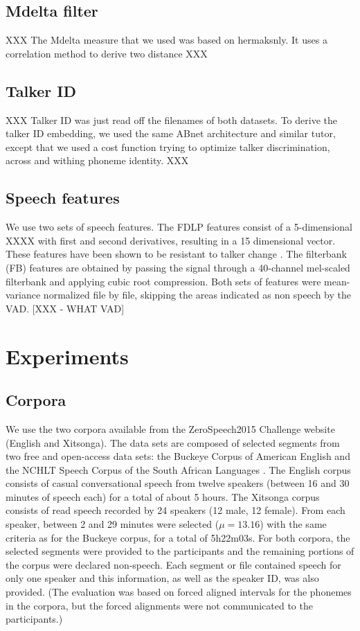 \documentclass[a4paper]{article}
\begin{document}
\subsection{Mdelta filter}

XXX
The Mdelta measure that we used was based on hermaksnly. It uses a correlation method to derive two distance
XXX

\subsection{Talker ID}

XXX
Talker ID was just read off the filenames of both datasets. To derive the talker ID embedding, we used the same ABnet architecture and similar tutor, except that we used a cost function trying to optimize talker discrimination, across and withing phoneme identity.
XXX

\subsection{Speech features}

We use two sets of speech features. The FDLP features consist of a 5-dimensional XXXX with first and second derivatives, resulting in a 15 dimensional vector. These features have been shown to be resistant to talker change \cite{XXX}. The filterbank (FB) features are obtained by passing the signal through a 40-channel mel-scaled filterbank and applying cubic root compression. Both sets of features were mean-variance normalized file by file, skipping the areas indicated as non speech by the VAD.  [XXX - WHAT VAD]

\section{Experiments}
\subsection{Corpora}

We use the two corpora available from the ZeroSpeech2015 Challenge website (English and Xitsonga). 
The data sets are composed of selected segments from two free and open-access data sets: the Buckeye Corpus
of American English \cite{XXX} and the NCHLT Speech Corpus of the South African Languages \cite{XXX}. The English corpus consists of casual conversational speech from twelve speakers (between 16 and 30 minutes of speech each) for a total of about 5 hours. The Xitsonga corpus consists of read speech recorded by 24 speakers (12 male, 12 female). From each speaker, between 2 and 29 minutes were selected ($\mu=13.16$) with the same criteria as for the Buckeye corpus, for a total of 5h22m03s. For both corpora, the selected segments were provided to the participants and the remaining portions of the corpus were declared non-speech. Each segment or file contained speech for only one speaker and this information, as well as the speaker ID, was also provided. (The evaluation was based on forced aligned intervals for the phonemes in the corpora, but the forced alignments were not communicated to the participants.)
\end{document}

